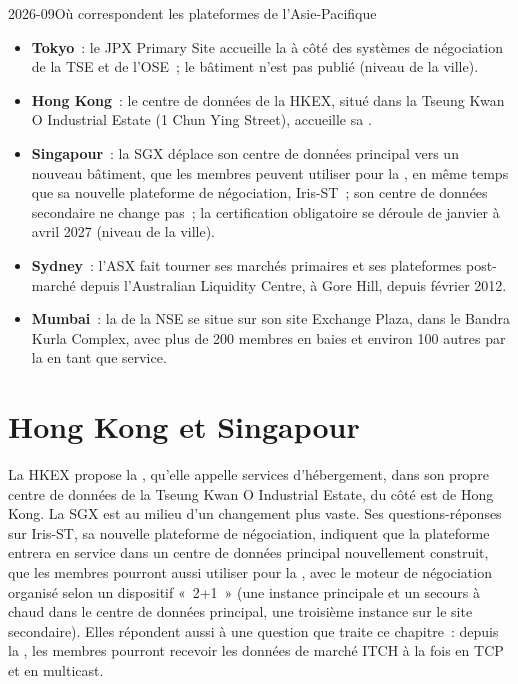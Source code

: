 \begin{dated}{2026-09}{Où correspondent les plateformes de l'Asie-Pacifique}\label{dat:nw:the-asia-pacific-map:sites}
\begin{itemize}
\item \textbf{Tokyo}~: le JPX Primary Site accueille la  à côté des systèmes de négociation de la TSE et de l'OSE~; le bâtiment n'est pas publié (niveau de la ville).
\item \textbf{Hong Kong}~: le centre de données de la HKEX, situé dans la Tseung Kwan O Industrial Estate (1 Chun Ying Street), accueille sa .
\item \textbf{Singapour}~: la SGX déplace son centre de données principal vers un nouveau bâtiment, que les membres peuvent utiliser pour la , en même temps que sa nouvelle
  plateforme de négociation, Iris-ST~; son centre de données secondaire ne change pas~; la certification obligatoire se déroule de janvier à avril 2027 (niveau de la ville).
\item \textbf{Sydney}~: l'ASX fait tourner ses marchés primaires et ses plateformes post-marché depuis l'Australian Liquidity Centre, à Gore Hill, depuis
  février 2012.
\item \textbf{Mumbai}~: la  de la NSE se situe sur son site Exchange Plaza, dans le Bandra Kurla Complex, avec plus de 200 membres en baies et environ 100
  autres par la  en tant que service.
\end{itemize}
\end{dated}

\section{Hong Kong et Singapour}

La HKEX propose la , qu'elle appelle services d'hébergement, dans son propre centre de données de la Tseung Kwan O Industrial Estate, du côté est
de Hong Kong. La SGX est au milieu d'un changement plus vaste. Ses questions-réponses sur Iris-ST, sa nouvelle plateforme de négociation, indiquent que la
plateforme entrera en service dans un centre de données principal nouvellement construit, que les membres pourront aussi utiliser pour la , avec le moteur de négociation organisé selon un dispositif «~2+1~» (une instance principale et un secours à chaud dans le centre de données principal, une troisième instance sur le site secondaire).
Elles répondent aussi à une question
que traite ce chapitre~: depuis la , les membres pourront recevoir les données de marché ITCH à la fois en TCP et en multicast.


